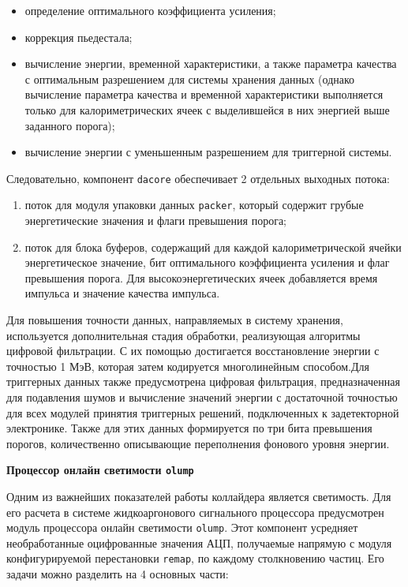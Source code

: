 \begin{itemize}
    \item определение оптимального коэффициента усиления;
    \item коррекция пьедестала;
    \item вычисление энергии, временной характеристики, а также параметра качества с оптимальным разрешением для системы хранения данных (однако вычисление параметра качества и временной характеристики выполняется только для калориметрических ячеек с выделившейся в них энергией выше заданного порога);
    \item вычисление энергии с уменьшенным разрешением для триггерной системы.
\end{itemize}\par
Следовательно, компонент \texttt{dacore} обеспечивает 2 отдельных выходных потока:\par
\begin{enumerate}
    \item поток для модуля упаковки данных \texttt{packer}, который содержит грубые энергетические значения и флаги превышения порога;
    \item поток для блока буферов, содержащий для каждой калориметрической ячейки энергетическое значение, бит оптимального коэффициента усиления и флаг превышения порога. Для высокоэнергетических ячеек добавляется время импульса и значение качества импульса.
\end{enumerate}\par
Для повышения точности данных, направляемых в систему хранения, используется дополнительная стадия обработки, реализующая алгоритмы цифровой фильтрации. С их помощью достигается восстановление энергии с точностью 1 МэВ, которая затем кодируется многолинейным способом.Для триггерных данных также предусмотрена цифровая фильтрация, предназначенная для подавления шумов и вычисление значений энергии с достаточной точностью для всех модулей принятия триггерных решений, подключенных к задетекторной электронике. Также для этих данных формируется по три бита превышения порогов, количественно описывающие переполнения фонового уровня энергии.\par
\textbf{Процессор онлайн светимости \texttt{olump}}\par
Одним из важнейших показателей работы коллайдера является светимость. Для его расчета в системе жидкоаргонового сигнального процессора предусмотрен модуль процессора онлайн светимости \texttt{olump}. Этот компонент усредняет необработанные оцифрованные значения АЦП, получаемые напрямую с модуля конфигурируемой перестановки \texttt{remap}, по каждому столкновению частиц. Его задачи можно разделить на 4 основных части:\par
